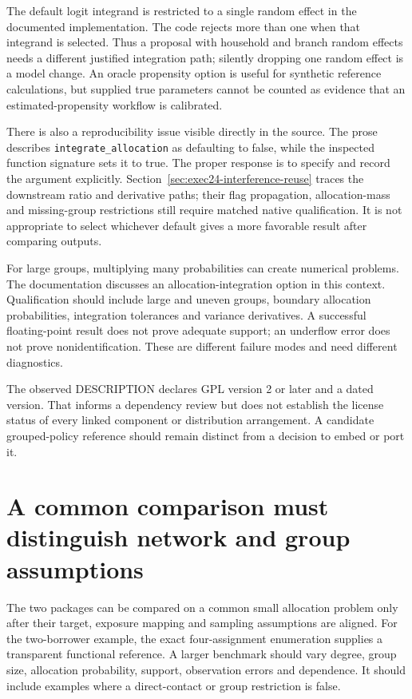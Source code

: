 The default logit integrand is restricted to a single random effect in the
documented implementation. The code rejects more than one when that integrand
is selected. Thus a proposal with household and branch random effects needs a
different justified integration path; silently dropping one random effect is
a model change. An oracle propensity option is useful for synthetic reference
calculations, but supplied true parameters cannot be counted as evidence that
an estimated-propensity workflow is calibrated.

There is also a reproducibility issue visible directly in the source. The prose
describes \texttt{integrate\_allocation} as defaulting to false, while the
inspected function signature sets it to true. The proper response is to specify
and record the argument explicitly. Section~\ref{sec:exec24-interference-reuse}
traces the downstream ratio and derivative paths; their flag propagation,
allocation-mass and missing-group restrictions still require matched native
qualification. It is not appropriate to select whichever default gives a more
favorable result after comparing outputs. \citep{v13_sw_inferference}

For large groups, multiplying many probabilities can create numerical problems.
The documentation discusses an allocation-integration option in this context.
Qualification should include large and uneven groups, boundary allocation
probabilities, integration tolerances and variance derivatives. A successful
floating-point result does not prove adequate support; an underflow error does
not prove nonidentification. These are different failure modes and need
different diagnostics.

The observed DESCRIPTION declares GPL version 2 or later and a dated version.
That informs a dependency review but does not establish the license status of
every linked component or distribution arrangement. A candidate grouped-policy
reference should remain distinct from a decision to embed or port it.

\section{A common comparison must distinguish network and group assumptions}

The two packages can be compared on a common small allocation problem only
after their target, exposure mapping and sampling assumptions are aligned.
For the two-borrower example, the exact four-assignment enumeration supplies a
transparent functional reference. A larger benchmark should vary degree,
group size, allocation probability, support, observation errors and dependence.
It should include examples where a direct-contact or group restriction is false.

